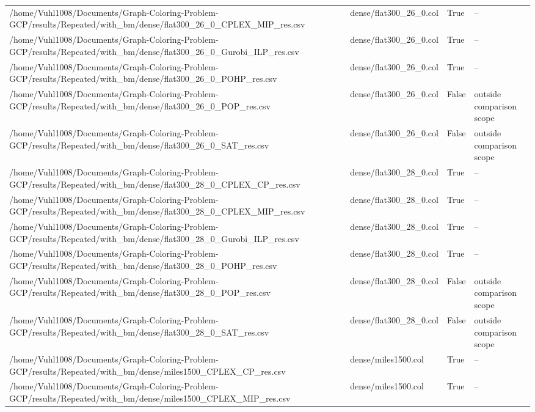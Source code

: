 \begin{table}[htbp]
\begin{tabular}{llll}
/home/Vuhl1008/Documents/Graph-Coloring-Problem-GCP/results/Repeated/with\_bm/dense/flat300\_26\_0\_CPLEX\_MIP\_res.csv & dense/flat300\_26\_0.col & True & -- \\
/home/Vuhl1008/Documents/Graph-Coloring-Problem-GCP/results/Repeated/with\_bm/dense/flat300\_26\_0\_Gurobi\_ILP\_res.csv & dense/flat300\_26\_0.col & True & -- \\
/home/Vuhl1008/Documents/Graph-Coloring-Problem-GCP/results/Repeated/with\_bm/dense/flat300\_26\_0\_POHP\_res.csv & dense/flat300\_26\_0.col & True & -- \\
/home/Vuhl1008/Documents/Graph-Coloring-Problem-GCP/results/Repeated/with\_bm/dense/flat300\_26\_0\_POP\_res.csv & dense/flat300\_26\_0.col & False & outside comparison scope \\
/home/Vuhl1008/Documents/Graph-Coloring-Problem-GCP/results/Repeated/with\_bm/dense/flat300\_26\_0\_SAT\_res.csv & dense/flat300\_26\_0.col & False & outside comparison scope \\
/home/Vuhl1008/Documents/Graph-Coloring-Problem-GCP/results/Repeated/with\_bm/dense/flat300\_28\_0\_CPLEX\_CP\_res.csv & dense/flat300\_28\_0.col & True & -- \\
/home/Vuhl1008/Documents/Graph-Coloring-Problem-GCP/results/Repeated/with\_bm/dense/flat300\_28\_0\_CPLEX\_MIP\_res.csv & dense/flat300\_28\_0.col & True & -- \\
/home/Vuhl1008/Documents/Graph-Coloring-Problem-GCP/results/Repeated/with\_bm/dense/flat300\_28\_0\_Gurobi\_ILP\_res.csv & dense/flat300\_28\_0.col & True & -- \\
/home/Vuhl1008/Documents/Graph-Coloring-Problem-GCP/results/Repeated/with\_bm/dense/flat300\_28\_0\_POHP\_res.csv & dense/flat300\_28\_0.col & True & -- \\
/home/Vuhl1008/Documents/Graph-Coloring-Problem-GCP/results/Repeated/with\_bm/dense/flat300\_28\_0\_POP\_res.csv & dense/flat300\_28\_0.col & False & outside comparison scope \\
/home/Vuhl1008/Documents/Graph-Coloring-Problem-GCP/results/Repeated/with\_bm/dense/flat300\_28\_0\_SAT\_res.csv & dense/flat300\_28\_0.col & False & outside comparison scope \\
/home/Vuhl1008/Documents/Graph-Coloring-Problem-GCP/results/Repeated/with\_bm/dense/miles1500\_CPLEX\_CP\_res.csv & dense/miles1500.col & True & -- \\
/home/Vuhl1008/Documents/Graph-Coloring-Problem-GCP/results/Repeated/with\_bm/dense/miles1500\_CPLEX\_MIP\_res.csv & dense/miles1500.col & True & -- \\

\end{tabular}
\end{table}
